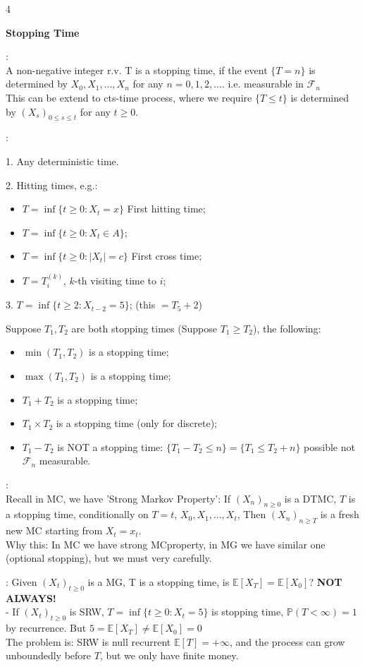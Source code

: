 \documentclass[a4paper, landscape]{article}
\newcommand{\topic}[1]{\par\medskip\textbf{#1}\par}
\newcommand{\subtopic}[1]{\par\textbf{#1}}
\renewcommand{\topic}[1]{\par\medskip\noindent\colorbox{highlightcolor}{\parbox{\dimexpr\columnwidth-2\fboxsep\relax}{\textbf{#1}}}\par}
\renewcommand{\subtopic}[1]{\par\textbf{\color{blue}{#1}}} %
\begin{document}
\begin{multicols}{4}
\topic{Stopping Time}
\subtopic{Definition}:\\
A non-negative integer r.v. T is a stopping time, if the event $\{T=n\}$ is determined by $X_0,X_1,...,X_n$ for any $n=0,1,2,...$. i.e. measurable in $\mathcal F_n$\\
This can be extend to cts-time process, where we require $\{T\leq t\}$ is determined by $(X_s)_{0\leq s\leq t}$ for any $t\geq 0$.

\subtopic{Examples of Stopping times}:
\par 1. Any deterministic time.
\par 2. Hitting times, e.g.:
\begin{itemize}
    \item $T=\inf \{t\geq0:X_t=x\}$ First hitting time;
    \item $T=\inf \{t\geq0:X_t\in A\}$;
    \item $T=\inf \{t\geq0:|X_t|= c\}$ First cross time;
    \item $T=T_i^{(k)}$, $k$-th visiting time to $i$;
\end{itemize}
\par 3. $T=\inf\{t\geq2:X_{t-2}=5\}$; (this $=T_5+2$)

\subtopic{Some Operations:}  Suppose $T_1,T_2$ are both stopping times (Suppose $T_1 \geq T_2$), the following:
\begin{itemize}
    \item $\min(T_1,T_2)$ is a stopping time;
    \item $\max(T_1,T_2)$ is a stopping time;    
    \item $T_1+T_2$ is a stopping time;
    \item $T_1\times T_2$ is a stopping time (only for discrete); 
    \item $T_1-T_2$ is NOT a stopping time: $\{T_1-T_2\leq n\}=\{T_1\leq T_2+ n\}$ possible not $\mathcal F_n$ measurable.
\end{itemize}

\subtopic{Why stopping time matters}:\\
Recall in MC, we have 'Strong Markov Property': If $(X_n)_{n\geq0}$ is a DTMC, $T$ is a stopping time, conditionally on $T=t$, $X_0,X_1,...,X_t$, Then $(X_n)_{n\geq T}$ is a fresh new MC starting from $X_t=x_t$.\\
Why this: In MC we have strong MCproperty, in MG we have similar one (optional stopping), but we must very carefully.

\subtopic{Another Counter-Example}: Given $(X_t)_{t\geq0}$ is a MG, T is a stopping time, is $\mathbb E[X_T]=\mathbb E[X_0]$? \textbf{NOT ALWAYS!}\\
- If $(X_t)_{t\geq0}$ is SRW, $T=\inf\{t\geq0:X_t=5\}$ is stopping time, $\mathbb P(T<\infty)=1$ by recurrence. But $5=\mathbb E[X_T]\neq\mathbb E[X_0]=0$\\
The problem is: SRW is null recurrent $\mathbb E[T]=+\infty$, and the process can grow unboundedly before $T$, but we only have finite money.
\vspace{6em}


\end{multicols}
\end{document}
